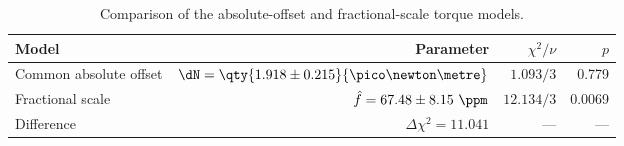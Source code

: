 \begin{table}[htbp]
\centering
\caption{Comparison of the absolute-offset and fractional-scale torque models.}
\label{tab:torque-models}
\small
\begin{tabular}{lrrr}
\toprule
Model & Parameter & $\chi^{2}/\nu$ & $p$ \\
\midrule
Common absolute offset & $\dN = \qty{1.918 \pm 0.215}{\pico\newton\metre}$ & $1.093/3$ & 0.779 \\
Fractional scale & $\hat f = 67.48 \pm 8.15\ \ppm$ & $12.134/3$ & 0.0069 \\
Difference & $\Delta\chi^{2} = 11.041$ & --- & --- \\
\bottomrule
\end{tabular}
\end{table}
